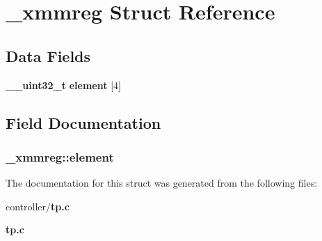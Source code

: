 \section{\_\-xmmreg Struct Reference}
\label{struct__xmmreg}
\subsection*{Data Fields}
\begin{DoxyCompactItemize}
\item 
{\bf \_\-\_\-uint32\_\-t} {\bf element} [4]
\end{DoxyCompactItemize}


\subsection{Field Documentation}
\subsubsection[{element}]{ {\bf \_\-xmmreg::element}}\label{struct__xmmreg_abf21d5a08ee658cac769df9ac1b675fe}


The documentation for this struct was generated from the following files:\begin{DoxyCompactItemize}
\item 
controller/{\bf tp.c}\item 
{\bf tp.c}\end{DoxyCompactItemize}
